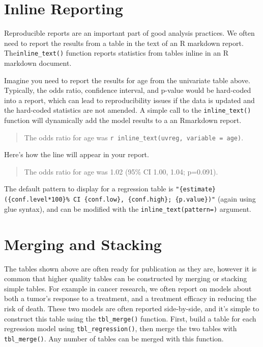 \section{Inline Reporting}

Reproducible reports are an important part of good analysis practices.
We often need to report the results from a table in the text of an R markdown report.
The\texttt{inline\_text()}  function reports statistics from  tables inline in an R markdown document.

Imagine you need to report the results for age from the univariate table above.
Typically, the odds ratio, confidence interval, and p-value would be hard-coded into a report, which can lead to reproducibility issues if the data is updated and the hard-coded statistics are not amended.
A simple call to the \texttt{inline\_text()} function will dynamically add the model results to a an Rmarkdown report.

\begin{quote}
The odds ratio for age was \texttt{\textasciigrave{}r\ inline\_text(uvreg,\ variable\ =\ age)\textasciigrave{}}.
\end{quote}

Here's how the line will appear in your report.

\begin{quote}
The odds ratio for age was 1.02 (95\% CI 1.00, 1.04; p=0.091).
\end{quote}

The default pattern to display for a regression table is \texttt{"\{estimate\} (\{conf.level*100\}\% CI \{conf.low\}, \{conf.high\}; \{p.value\})"} (again using glue syntax), and can be modified with the \texttt{inline\_text(pattern=)} argument. 

\section{Merging and Stacking}

The  tables shown above are often ready for publication as they are, however it is common that higher quality tables can be constructed by merging or stacking simple tables.
For example in cancer research, we often report on models about both a tumor's response to a treatment, and a treatment efficacy in reducing the risk of death.
These two models are often reported side-by-side, and it's simple to construct this table using  the \texttt{tbl\_merge()} function.
First, build a table for each regression model using \texttt{tbl\_regression()}, then merge the two tables with \texttt{tbl\_merge()}. Any number of  tables can be merged with this function.

